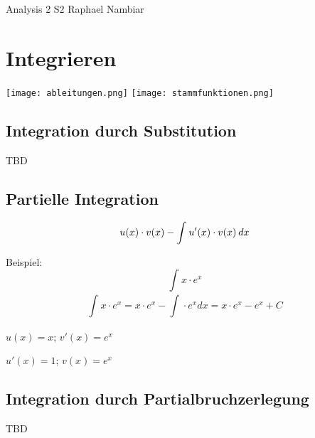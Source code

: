 



\begin{multicols*}{3}

\DocumentInfo
{Analysis 2 S2} %
{Raphael Nambiar} %

\WhiteSpace

\section{Integrieren}

 \texttt{[image: ableitungen.png]} 
  \texttt{[image: stammfunktionen.png]} 

\subsection{Integration durch Substitution}
{TBD}

\subsection{Partielle Integration}
{\large $$u(x)\cdot v(x) - \int_{}^{}u'(x) \cdot v(x) \hspace{2px}  dx$$}

\begin{multicols}{2}
{Beispiel:}
 \[ \int_{}{}x\cdot e^x\]
$$ \int_{}{}x\cdot e^x = x\cdot e^x -  \int_{}{}\cdot e^x dx = x\cdot e^x - e^x + C $$
\columnbreak
 
{$u(x)=x$; $v'(x)=e^x$}

{$u'(x)=1$; $v(x)=e^x$}

\end{multicols}





\subsection{Integration durch Partialbruchzerlegung}
{TBD}

\WhiteSpace

\mbox{}
	
\end{multicols*} 


